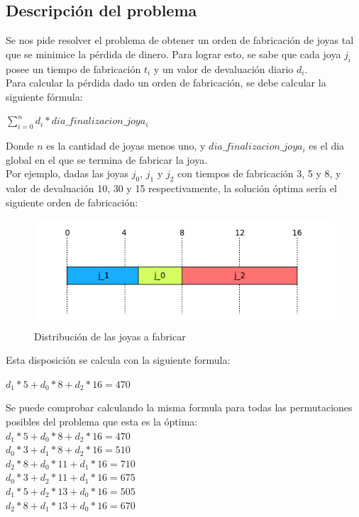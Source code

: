\subsection{Descripci\'on del problema}

Se nos pide resolver el problema de obtener un orden de fabricaci\'on de joyas tal que se minimice la p\'erdida de dinero. Para lograr esto, se sabe que cada joya $j_{i}$ posee un tiempo de fabricaci\'on $t_{i}$ y un valor de devaluaci\'on diario $d_{i}$. \\

Para calcular la p\'erdida dado un orden de fabricaci\'on, se debe calcular la siguiente f\'ormula:

$\sum\limits_{i=0}^n d_{i}*dia\_finalizacion\_joya_{i}$

Donde $n$ es la cantidad de joyas menos uno, y $dia\_finalizacion\_joya_{i}$ es el dia global en el que se termina de fabricar la joya.\\

Por ejemplo, dadas las joyas $j_{0}$, $j_{1}$ y $j_{2}$ con tiempos de fabricaci\'on 3, 5 y 8, y valor de devaluaci\'on 10, 30 y 15 respectivamente, la soluci\'on \'optima ser\'ia el siguiente orden de fabricaci\'on:

\begin{center}
\begin{figure}[h]
\includegraphics[scale=0.7]{./img/ej2_chart1.png}
\caption{Distribuci\'on de las joyas a fabricar}
\end{figure}
\end{center}

Esta disposici\'on se calcula con la siguiente formula:

$d_{1}*5 + d_{0}*8 + d_{2}*16 = 470$

Se puede comprobar calculando la misma formula para todas las permutaciones posibles del problema que esta es la \'optima: \\

$d_{1}*5 + d_{0}*8 + d_{2}*16 = 470$ \\
$d_{0}*3 + d_{1}*8 + d_{2}*16 = 510$ \\
$d_{2}*8 + d_{0}*11 + d_{1}*16 = 710$ \\
$d_{0}*3 + d_{2}*11 + d_{1}*16 = 675$ \\
$d_{1}*5 + d_{2}*13 + d_{0}*16 = 505$ \\
$d_{2}*8 + d_{1}*13 + d_{0}*16 = 670$ \\

